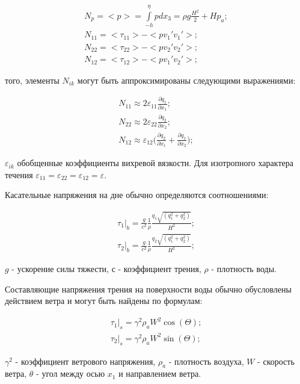 \documentclass[14pt]{extreport}
\begin{document}

\begin{gather} 
N_p = <p> = \int\limits^\eta_{-h} pdx_3=\rho g \frac{H^2}{2} + Hp_a; \nonumber\\
N_{11} = <\tau_{11}>-<pv_1'v_1'>; \nonumber\\
N_{22} = <\tau_{22}>-<pv_2'v_2'>; \nonumber\\
N_{12} = <\tau_{12}>-<pv_1'v_2'>;
\end{gather}

 того, элементы $N_{ik}$ могут быть аппроксимированы следующими выражениями:

\begin{gather} 
N_{11} \approx 2 \varepsilon_{11}\frac{\partial q_1}{\partial x_1}; \nonumber\\
N_{22} \approx 2 \varepsilon_{22}\frac{\partial q_2}{\partial x_2}; \nonumber\\
N_{12} \approx \varepsilon_{12}\bigg(\frac{\partial q_2}{\partial x_1}+\frac{\partial q_1}{\partial x_2}\bigg);
\end{gather}


 $\varepsilon_{ik}$ обобщенные коэффициенты вихревой вязкости. Для изотропного характера течения $\varepsilon_{11}=\varepsilon_{22}=\varepsilon_{12}=\varepsilon.$

Касательные напряжения на дне обычно определяются соотношениями:

\begin{gather}
\tau_1\bigg|_b = \frac{g}{c^2} \frac{1}{\rho} \frac{q_1\sqrt{(q_1^2+q_2^2)}}{H^2}; \nonumber\\
\tau_2\bigg|_b = \frac{g}{c^2} \frac{1}{\rho} \frac{q_2\sqrt{(q_1^2+q_2^2)}}{H^2};
\end{gather}

 $g$ - ускорение силы тяжести, $с$ - коэффициент трения, $\rho$ - плотность воды. 

Составляющие напряжения трения на поверхности воды обычно обусловлены действием ветра и могут быть найдены по формулам:

\begin{gather}
\tau_1\bigg|_s=\gamma^2\rho_aW^2\cos(\Theta); \nonumber\\
\tau_2\bigg|_s=\gamma^2\rho_aW^2\sin(\Theta);
\end{gather} 

 $\gamma^2$ - коэффициент ветрового напряжения, $\rho_a$ - плотность воздуха, $W$ - скорость ветра, $\theta$ - угол между осью $x_1$ и направлением ветра.
\end{document}
